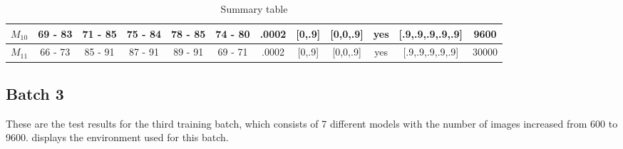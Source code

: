 \begin{table}[H]
{\begin{tabular}{|c|c|c|c|c|c|c|c|c|c|c|c|}
\rowcolor[HTML]{FFFFFF} 
$M_{10}$                                                                             & 69 - 83                                 & 71 - 85                                 & 75 - 84                                 & 78 - 85                                 & 74 - 80                                 & .0002                                                                                   & {[}0,.9{]}                                                                                  & {[}0,0,.9{]}                                                                               & yes                                                                                       & {[}.9,.9,.9,.9,.9{]}                                                                    & 9600                                                                                      \\ \hline
\rowcolor[HTML]{FFFFFF} 
$M_{11}$                                                                             & 66 - 73                                 & 85 - 91                                 & 87 - 91                                 & 89 - 91                                 & 69 - 71                                 & .0002                                                                                   & {[}0,.9{]}                                                                                  & {[}0,0,.9{]}                                                                               & yes                                                                                       & {[}.9,.9,.9,.9,.9{]}                                                                    & 30000                                                                                     \\ \hline
\end{tabular}
}
\caption{Summary table}
\label{tab:summary_table_2}
\end{table}

\newpage

\subsection{Batch 3 \label{batch_3} }
These are the test results for the third training batch, which consists of 7 different models with the number of images increased from 600 to 9600.  displays the environment used for this batch.

